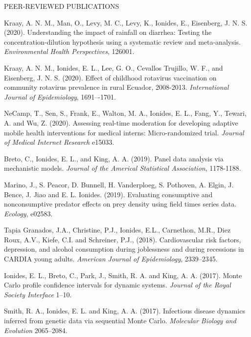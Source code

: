 \begin{reflist}{PEER-REVIEWED PUBLICATIONS}
\item Kraay, A. N. M., Man, O., Levy, M. C., Levy, K., Ionides, E., Eisenberg, J. N. S. (2020). Understanding the impact of rainfall on diarrhea: Testing the concentration-dilution hypothesis using a systematic review and meta-analysis. {\em Environmental Health Perspectives}, {}{\separator}126001.
  
\item Kraay, A. N. M., Ionides, E. L., Lee, G. O., Cevallos Trujillo, W. F., and Eisenberg, J. N. S. (2020). Effect of childhood rotavirus vaccination on community rotavirus prevalence in rural Ecuador, 2008-2013. {\em International Journal of Epidemiology}, {}{\separator}1691–-1701.
  
\item NeCamp, T., Sen, S., Frank, E., Walton, M. A., Ionides, E. L., Fang, Y., Tewari, A. and Wu, Z. (2020). Assessing real-time moderation for developing adaptive mobile health interventions for medical interns: Micro-randomized trial.
  {\it Journal of Medical Internet Research} {}{\separator}e15033.
  
\item Breto, C., Ionides, E. L., and King, A. A. (2019). Panel data analysis via mechanistic models. {\it Journal of the Americal Statistical Association}, {}{\separator}1178-1188.

\item Marino, J., S. Peacor, D. Bunnell, H. Vanderploeg, S. Pothoven, A. Elgin, J. Bence, J. Jiao and E. L. Ionides. (2019). Evaluating consumptive and nonconsumptive predator effects on prey density using field times series data. {\it Ecology}, {}{\separator}e02583.

\item Tapia Granados, J.A., Christine, P.J., Ionides, E.L., Carnethon, M.R., Diez Roux, A.V., Kiefe, C.I. and Schreiner, P.J., (2018). Cardiovascular risk factors, depression, and alcohol consumption during joblessness and during recessions in CARDIA young adults. 
  {\it American Journal of Epidemiology}, {}{\separator}2339--2345.

\item Ionides, E. L., Breto, C., Park, J., Smith, R. A. and King, A. A. (2017). Monte Carlo profile confidence intervals for dynamic systems. {\it Journal of the Royal Society Interface} {}{\separator}1--10.

\item Smith, R. A., Ionides, E. L. and King, A. A. (2017). Infectious disease dynamics inferred from genetic data via sequential Monte Carlo. {\it Molecular Biology and Evolution} {}{\separator}2065--2084.


\end{reflist}
